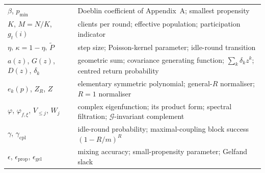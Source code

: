 \documentclass[twoside,11pt]{article}
\begin{document}
\begin{longtable}{@{}lp{3.30in}@{}}
$\beta$, $p_{\min}$ & Doeblin coefficient of Appendix~A; smallest propensity \\
$K$, $M=N/K$, $g_t(i)$ & clients per round; effective population; participation indicator \\
$\eta$, $\kappa=1-\eta$, $\widetilde P$ & step size; Poisson-kernel parameter; idle-round transition \\
$a(z)$, $G(z)$, $D(z)$, $\delta_k$ & geometric sum; covariance generating function; $\sum_k\delta_k z^k$; centred return probability \\
$e_k(p)$, $Z_R$, $Z$ & elementary symmetric polynomial; general-$R$ normaliser; $R=1$ normaliser \\
$\varphi$, $\varphi_{f,\xi}$, $V_{\le j}$, $W_j$ & complex eigenfunction; its product form; spectral filtration; $\mathcal{G}$-invariant complement \\
$\gamma$, $\gamma_{\mathrm{cpl}}$ & idle-round probability; maximal-coupling block success $(1-R/m)^R$ \\
$\epsilon$, $\epsilon_{\mathrm{prop}}$, $\epsilon_{\mathrm{gel}}$ & mixing accuracy; small-propensity parameter; Gelfand slack \\
\end{longtable}


\end{document}
